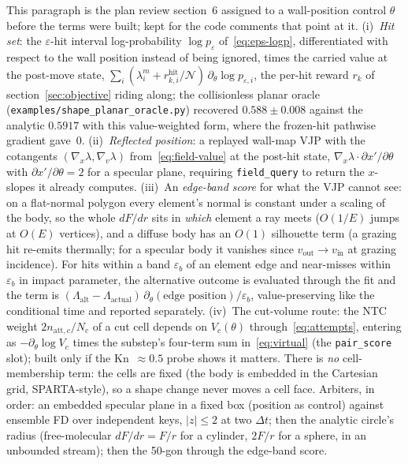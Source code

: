 \documentclass[11pt,a4paper]{article}
\numberwithin{equation}{section}
\newcommand{\code}[1]{\texttt{#1}}
\newcommand{\Nn}{\mathcal{N}}
\begin{document}
This paragraph is the plan review section~6 assigned to a wall-position control
$\theta$ before the terms were built; kept for the code comments that point at it.
(i)~\emph{Hit set}: the $\varepsilon$-hit interval log-probability
$\log p_\varepsilon$ of~\eqref{eq:eps-logp}, differentiated with respect to the wall
position instead of being ignored, times the carried value at the post-move state,
$\sum_i (\lambda^m_i + r^{\mathrm{hit}}_{k,i}/\Nn)\, \partial_\theta \log p_{\varepsilon,i}$, the per-hit
reward $r_k$ of section~\ref{sec:objective} riding along; the collisionless planar
oracle (\code{examples/shape\_planar\_oracle.py}) recovered $0.588 \pm 0.008$ against the
analytic $0.5917$ with this value-weighted form, where the frozen-hit pathwise
gradient gave~$0$.  (ii)~\emph{Reflected position}: a replayed wall-map VJP with the
cotangents $(\nabla_x \lambda, \nabla_v \lambda)$ from~\eqref{eq:field-value} at the post-hit
state, $\nabla_x\lambda\cdot \partial x'/\partial\theta$ with $\partial x'/\partial\theta = 2$
for a specular plane, requiring \code{field\_query} to return the $x$-slopes it already
computes.  (iii)~An \emph{edge-band score} for what the VJP cannot see: on a
flat-normal polygon every element's normal is constant under a scaling of the body, so
the whole $dF/dr$ sits in \emph{which} element a ray meets ($O(1/E)$ jumps at $O(E)$
vertices), and a diffuse body has an $O(1)$ silhouette term (a grazing hit re-emits
thermally; for a specular body it vanishes since $v_{\mathrm{out}} \to v_{\mathrm{in}}$ at
grazing incidence).  For hits within a band $\varepsilon_b$ of an element edge and
near-misses within $\varepsilon_b$ in impact parameter, the alternative outcome is
evaluated through the fit and the term is $(\Lambda_{\mathrm{alt}} - \Lambda_{\mathrm{actual}})\,
\partial_\theta(\text{edge position})/\varepsilon_b$, value-preserving like the
conditional time and reported separately.  (iv)~The cut-volume route: the NTC weight
$2 n_{\mathrm{att},c}/N_c$ of a cut cell depends on $V_c(\theta)$ through~\eqref{eq:attempts},
entering as $-\partial_\theta \log V_c$ times the substep's four-term sum
in~\eqref{eq:virtual} (the \code{pair\_score} slot); built only if the Kn~$\approx 0.5$
probe shows it matters.
There is \emph{no} cell-membership term: the cells are fixed (the body is embedded in
the Cartesian grid, SPARTA-style), so a shape change never moves a cell face.
Arbiters, in order: an embedded specular plane in a fixed box (position as control)
against ensemble FD over independent keys, $|z| \le 2$ at two $\Delta t$; then the analytic
circle's radius (free-molecular $dF/dr = F/r$ for a cylinder, $2F/r$ for a sphere, in an
unbounded stream); then the 50-gon through the edge-band score.
\end{document}
